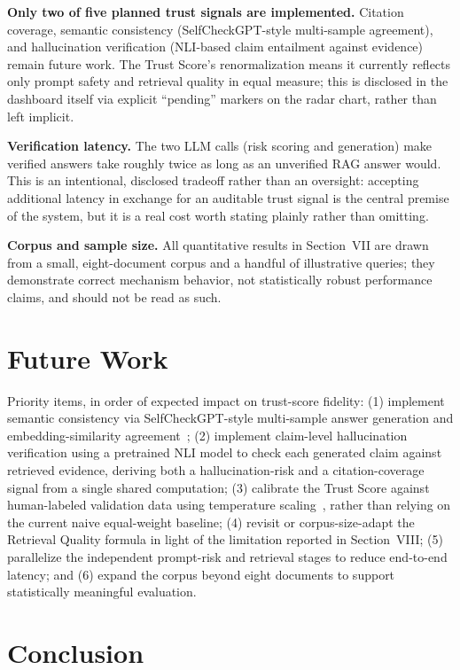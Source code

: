 \documentclass[conference]{IEEEtran}
\begin{document}
\textbf{Only two of five planned trust signals are implemented.} Citation coverage,
semantic consistency (SelfCheckGPT-style multi-sample agreement), and hallucination
verification (NLI-based claim entailment against evidence) remain future work. The
Trust Score's renormalization means it currently reflects only prompt safety and
retrieval quality in equal measure; this is disclosed in the dashboard itself via
explicit ``pending'' markers on the radar chart, rather than left implicit.

\textbf{Verification latency.} The two LLM calls (risk scoring and generation) make
verified answers take roughly twice as long as an unverified RAG answer would. This is
an intentional, disclosed tradeoff rather than an oversight: accepting additional
latency in exchange for an auditable trust signal is the central premise of the system,
but it is a real cost worth stating plainly rather than omitting.

\textbf{Corpus and sample size.} All quantitative results in Section~VII are drawn from
a small, eight-document corpus and a handful of illustrative queries; they demonstrate
correct mechanism behavior, not statistically robust performance claims, and should not
be read as such.

\section{Future Work}

Priority items, in order of expected impact on trust-score fidelity: (1) implement
semantic consistency via SelfCheckGPT-style multi-sample answer generation and
embedding-similarity agreement~\cite{selfcheckgpt}; (2) implement claim-level
hallucination verification using a pretrained NLI model to check each generated claim
against retrieved evidence, deriving both a hallucination-risk and a citation-coverage
signal from a single shared computation; (3) calibrate the Trust Score against
human-labeled validation data using temperature scaling~\cite{guo2017calibration}, rather
than relying on the current naive equal-weight baseline; (4) revisit or corpus-size-adapt
the Retrieval Quality formula in light of the limitation reported in Section~VIII; (5)
parallelize the independent prompt-risk and retrieval stages to reduce end-to-end
latency; and (6) expand the corpus beyond eight documents to support statistically
meaningful evaluation.

\section{Conclusion}
\end{document}
